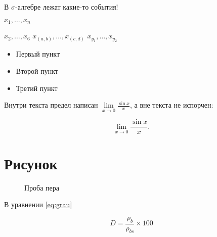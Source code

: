 \documentclass[12pt, a4paper]{article}
\theoremstyle{plain}              %
\theoremstyle{definition}         %
\begin{document}

\def \s{\ensuremath{\sigma}}

В \s-алгебре лежат какие-то события! 



\newcommand{\xvect}{\ensuremath{x_1,\ldots,x_n}}

\xvect

\newcommand{\xvec}[2]{\ensuremath{x_{#1},\ldots,x_{#2}}}

\xvec{2}{6} 
\xvec{(a,b)}{(c,d)}
\xvec{y_1}{y_2}






\newcommand*{\MyPoint}{\tikz \draw [baseline, fill=blue,draw=blue] circle (2.5pt);}
\renewcommand{\labelitemi}{\MyPoint}

\begin{itemize}
\item Первый пункт
\item Второй пункт
\item Третий пункт
\end{itemize}

\newcommand{\llim}[2]{\lim\limits_{{#1}\to{#2}}}

Внутри текста предел написан  $ \llim{x}{0} \frac{\sin{x}}{x}$, а вне текста не испорчен: 

\[ \llim{x}{0} \frac{\sin{x}}{x}. \]






\section{Рисунок} 

\renewcommand{\thefigure}{\thesection:\arabic{figure}}    

\begin{figure}[H]
\center {} 
\caption{Проба пера}
\end{figure}


\renewcommand{\theequation}{Eq. (\arabic{equation})}

В уравнении \ref{eq:grau}

\begin{equation} 
D=\frac{\rho_{b}}{\rho_{bs}}\times100
\label{eq:grau}
\end{equation}
\end{document}
